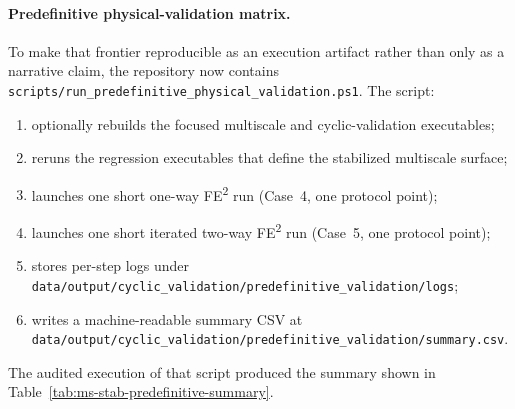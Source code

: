 \paragraph{Predefinitive physical-validation matrix.}
To make that frontier reproducible as an execution artifact rather than only as
a narrative claim, the repository now contains
\texttt{scripts/run\_predefinitive\_physical\_validation.ps1}.  The script:
\begin{enumerate}
  \item optionally rebuilds the focused multiscale and cyclic-validation
    executables;
  \item reruns the regression executables that define the stabilized
    multiscale surface;
  \item launches one short one-way FE\textsuperscript{2} run
    (Case~4, one protocol point);
  \item launches one short iterated two-way FE\textsuperscript{2} run
    (Case~5, one protocol point);
  \item stores per-step logs under
    \texttt{data/output/cyclic\_validation/predefinitive\_validation/logs};
  \item writes a machine-readable summary CSV at
    \texttt{data/output/cyclic\_validation/predefinitive\_validation/summary.csv}.
\end{enumerate}

The audited execution of that script produced the summary shown in
Table~\ref{tab:ms-stab-predefinitive-summary}.

